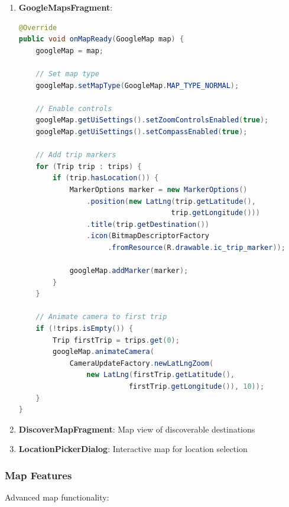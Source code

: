 \documentclass[12pt,a4paper]{article}
\begin{document}
\begin{enumerate}
    \item \textbf{GoogleMapsFragment}:
    \begin{lstlisting}[language=Java, caption=Google Maps Setup]
@Override
public void onMapReady(GoogleMap map) {
    googleMap = map;

    // Set map type
    googleMap.setMapType(GoogleMap.MAP_TYPE_NORMAL);

    // Enable controls
    googleMap.getUiSettings().setZoomControlsEnabled(true);
    googleMap.getUiSettings().setCompassEnabled(true);

    // Add trip markers
    for (Trip trip : trips) {
        if (trip.hasLocation()) {
            MarkerOptions marker = new MarkerOptions()
                .position(new LatLng(trip.getLatitude(),
                                    trip.getLongitude()))
                .title(trip.getDestination())
                .icon(BitmapDescriptorFactory
                     .fromResource(R.drawable.ic_trip_marker));

            googleMap.addMarker(marker);
        }
    }

    // Animate camera to first trip
    if (!trips.isEmpty()) {
        Trip firstTrip = trips.get(0);
        googleMap.animateCamera(
            CameraUpdateFactory.newLatLngZoom(
                new LatLng(firstTrip.getLatitude(),
                          firstTrip.getLongitude()), 10));
    }
}
    \end{lstlisting}

    \item \textbf{DiscoverMapFragment}: Map view of discoverable destinations
    \item \textbf{LocationPickerDialog}: Interactive map for location selection
\end{enumerate}

\subsubsection{Map Features}
Advanced map functionality:
\end{document}
